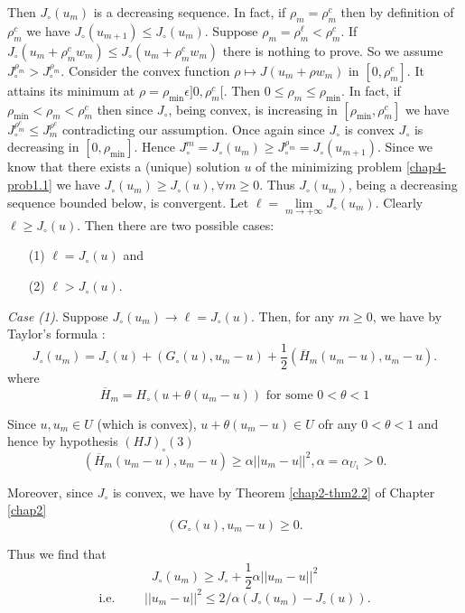 Then $J_{\circ}(u_{m})$ is a decreasing sequence. In fact, if $\rho_{m} = \rho_{m}^{c}$ then by definition of $\rho_{m}^{c}$ we have $J_{\circ} (u_{m+1}) \leq J_{\circ}(u_{m})$. Suppose $\rho_{m} = \rho_{m}^{\ell} < \rho_{m}^{c}$. If $J_{\circ} (u_{m} + \rho_{m}^{c} w_{m}) \leq J_{\circ}(u_{m} + \rho_{m}^{c} w_{m})$ there is nothing to prove. So we assume $J_{\circ}^{\rho_{m}} > J_{\circ}^{\rho_{m}}$. Consider the convex function $\rho \mapsto J(u_{m} + \rho w_{m})$ in $[0, \rho_{m}^{c}]$. It attains its minimum at $\rho = \rho_{\min} \epsilon ]0, \rho_{m}^{c}[$. Then $0 \leq \rho_{m} \leq \rho_{\min}$. In fact, if $\rho_{\min} < \rho_{m} < \rho_{m}^{c}$ then since $J_{\circ}$, being convex, is increasing in $[\rho_{\min}, \rho_{m}^{c}]$ we have $J_{\circ}^{\rho_{m}^{c}} \leq J_{m}^{\rho^{c}}$ contradicting our assumption. Once again since $J_{\circ}$ is convex $J_{\circ}$ is decreasing in $[0, \rho_{\min}]$. Hence $J_{\circ}^{m} = J_{\circ}(u_{m}) \geq J_{\circ}^{\rho_{m}} = J_{\circ}(u_{m+1})$. Since we know that there exists a (unique) solution $u$ of the minimizing problem \ref{chap4-prob1.1} we have $J_{\circ}(u_{m}) \geq J_{\circ}(u), \forall m \geq 0$. Thus $J_{\circ}(u_{m})$, being a decreasing sequence bounded below, is convergent. Let $\ell = \lim\limits_{m \to + \infty} J_{\circ}(u_{m})$. Clearly $\ell \geq J_{\circ}(u)$. Then there are two possible cases:
\begin{enumerate}
\item[(1)] $\ell = J_{\circ} (u)$ and 
\item[(2)] $\ell > J_{\circ} (u)$.
\end{enumerate}

{\em Case (1)}. Suppose $J_{\circ} (u_{m}) \to \ell = J_{\circ}(u)$. Then, for any $m \geq 0$, we have by Taylor's formula :
$$
J_{\circ} (u_{m}) = J_{\circ}(u) + (G_{\circ}(u), u_{m} - u) + \frac{1}{2} (\overline{H}_{m}(u_{m}-u), u_{m}-u).
$$\pageoriginale
where
$$
\overline{H}_{m} = H_{\circ} (u+\theta(u_{m}-u)) \text{ for some } 0 < \theta < 1
$$

Since $u, u_{m} \in U$ (which is convex), $u + \theta(u_{m}-u) \in U$ ofr any $0 < \theta < 1$ and hence by hypothesis $(HJ)_{\circ} (3)$
$$
(\overline{H}_{m} (u_{m}-u), u_{m} -u) \geq \alpha ||u_{m}-u||^{2}, \alpha = \alpha_{U_{1}} > 0.
$$

Moreover, since $J_{\circ}$ is convex, we have by Theorem \ref{chap2-thm2.2} of Chapter \ref{chap2} 
$$
(G_{\circ}(u), u_{m}-u) \geq 0.
$$

Thus we find that
$$
J_{\circ}(u_{m}) \geq J_{\circ} + \frac{1}{2} \alpha ||u_{m}-u||^{2}
$$
\begin{equation*}
\text{i.e. }\qquad ||u_{m}-u||^{2} \leq 2 / \alpha (J_{\circ}(u_{m}) - J_{\circ}(u)).
\end{equation*}

